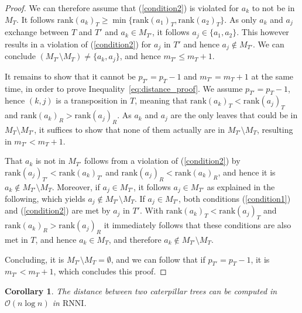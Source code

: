 \documentclass[11pt]{amsart}
\newtheorem{corollary}{Corollary}
\newcommand{\rnni}{\mathrm{RNNI}}
\newcommand{\rank}{\mathrm{rank}}
\newcommand{\dtt}{\mathrm{DtT}}
\renewcommand{\O}{\mathcal O}
\begin{document}
\begin{proof}
	We can therefore assume that (\ref{condition2}) is violated for $a_k$ to not be in $M_T$.
	It follows $\rank(a_k)_T \geq \min\{\rank(a_1)_T, \rank(a_2)_T\}$.
	As only $a_k$ and $a_j$ exchange between $T$ and $T'$ and $a_k \in M_{T'}$, it follows $a_j \in \{a_1, a_2\}$.
	This however results in a violation of (\ref{condition2}) for $a_j$ in $T'$ and hence $a_j \notin M_{T'}$.
	We can conclude $(M_{T'} \setminus M_T) \neq \{a_k, a_j\}$, and hence $m_{T'} \leq m_T + 1$.

	It remains to show that it cannot be $p_{T'} = p_T - 1$ and $m_{T'} = m_T + 1$ at the same time, in order to prove Inequality~\ref{eq:distance_proof}.
	We assume $p_{T'} = p_T - 1$, hence $(k,j)$ is a transposition in $T$, meaning that $\rank(a_k)_T < \rank(a_j)_T$ and $\rank(a_k)_R > \rank(a_j)_R$.
	As $a_k$ and $a_j$ are the only leaves that could be in $M_T \setminus M_{T'}$, it suffices to show that none of them actually are in $M_{T'} \setminus M_T$, resulting in $m_{T'} < m_T + 1$.

	That $a_k$ is not in $M_{T'}$ follows from a violation of (\ref{condition2}) by $\rank(a_j)_{T'} < \rank(a_k)_{T'}$ and $\rank(a_j)_R < \rank(a_k)_R$, and hence it is $a_k \notin M_{T'} \setminus M_T$.
	Moreover, if $a_j \in M_{T'}$, it follows $a_j \in M_{T'}$ as explained in the following, which yields $a_j \notin M_{T'} \setminus M_T$.
	If $a_j \in M_{T'}$, both conditions (\ref{condition1}) and (\ref{condition2}) are met by $a_j$ in $T'$.
	With $\rank(a_k)_T < \rank(a_j)_T$ and $\rank(a_k)_R > \rank(a_j)_R$ it immediately follows that these conditions are also met in $T$, and hence $a_k \in M_T$, and therefore $a_k \notin M_{T'} \setminus M_T$.

	Concluding, it is $M_{T'} \setminus M_T = \emptyset$, and we can follow that if $p_{T'} = p_T - 1$, it is $m_{T'} < m_T + 1$, which concludes this proof.
\end{proof}

\todo{Can this somehow be used in $\dtt_m$?}

\begin{corollary}
	The distance between two caterpillar trees can be computed in $\O(n \log n)$ in $\rnni$.
	\label{cor:caterpillar_distance_rnni_nlogn}
\end{corollary}
\end{document}

